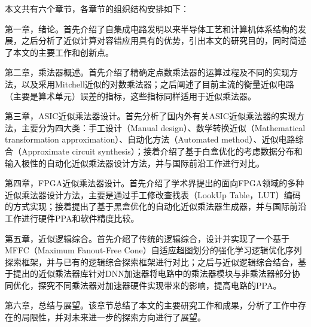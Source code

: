 本文共有六个章节，各章节的组织结构安排如下：

第一章，绪论。首先介绍了自集成电路发明以来半导体工艺和计算机体系结构的发展，之后分析了近似计算对容错应用具有的优势，引出本文的研究目的，同时简述了本文的主要工作和创新点。

第二章，乘法器概述。首先介绍了精确定点数乘法器的运算过程及不同的实现方法，以及采用Mitchell近似的对数乘法器\cite{EM:mitchell}；之后阐述了目前主流的衡量近似电路（主要是算术单元）误差的指标，这些指标同样适用于近似乘法器。

第三章，ASIC近似乘法器设计。首先分析了国内外有关ASIC近似乘法器的实现方法，主要分为四大类：手工设计（Manual design）、数学转换近似（Mathematical transformation approximation）、自动化方法（Automated method）、近似电路综合（Approximate circuit synthesis）；接着介绍了基于白盒优化的考虑数据分布和输入极性的自动化近似乘法器设计方法，并与国际前沿工作进行对比。

第四章，FPGA近似乘法器设计。首先介绍了学术界提出的面向FPGA领域的多种近似乘法器设计方法，主要是通过手工修改查找表（LookUp Table，LUT）编码的方式实现；接着提出了基于黑盒优化的自动化近似乘法器生成器，并与国际前沿工作进行硬件PPA和软件精度比较。

第五章，近似逻辑综合。首先介绍了传统的逻辑综合，设计并实现了一个基于MFFC（Maximum Fanout-Free Cone）自适应超图划分的强化学习逻辑优化序列探索框架，并与已有的逻辑综合探索框架进行对比；之后与近似逻辑综合结合，基于提出的近似乘法器库针对DNN加速器将电路中的乘法器模块与非乘法器部分协同优化，探究不同乘法器对加速器硬件实现带来的影响，提高电路的PPA。

第六章，总结与展望。该章节总结了本文的主要研究工作和成果，分析了工作中存在的局限性，并对未来进一步的探索方向进行了展望。

